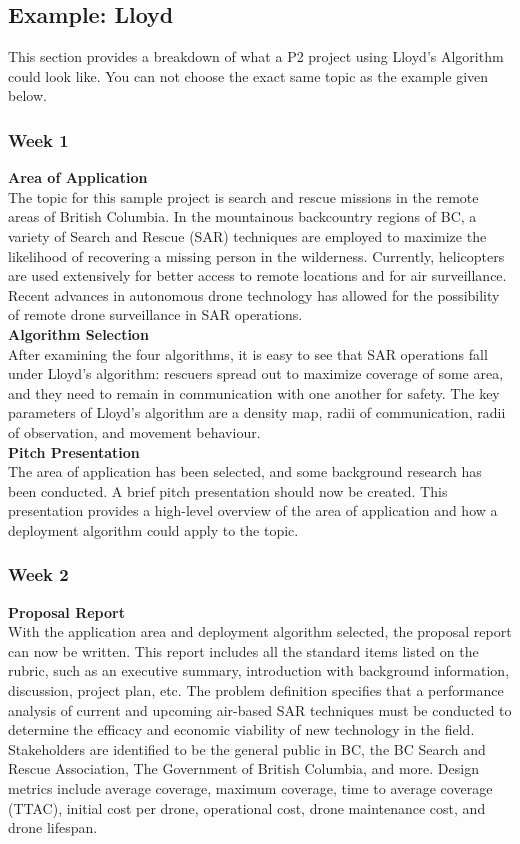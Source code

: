 \documentclass[../CourseManual.tex]{subfiles}
\begin{document}
\subsection{Example: Lloyd} \label{Example: Lloyd}
This section provides a breakdown of what a P2 project using Lloyd's Algorithm could look like. You can not choose the exact same topic as the example given below.

\subsubsection{Week 1}
\textbf{Area of Application}\\
The topic for this sample project is search and rescue missions in the remote areas of British Columbia. In the mountainous backcountry regions of BC, a variety of Search and Rescue (SAR) techniques are employed to maximize the likelihood of recovering a missing person in the wilderness. Currently, helicopters are used extensively for better access to remote locations and for air surveillance. Recent advances in autonomous drone technology has allowed for the possibility of remote drone surveillance in SAR operations. \\

\textbf{Algorithm Selection}\\
After examining the four algorithms, it is easy to see that SAR operations fall under Lloyd's algorithm: rescuers spread out to maximize coverage of some area, and they need to remain in communication with one another for safety. The key parameters of Lloyd's algorithm are a density map, radii of communication, radii of observation, and movement behaviour. \\

\textbf{Pitch Presentation}\\
The area of application has been selected, and some background research has been conducted. A brief pitch presentation should now be created. This presentation provides a high-level overview of the area of application and how a deployment algorithm could apply to the topic.

\subsubsection{Week 2}
\textbf{Proposal Report}\\
With the application area and deployment algorithm selected, the proposal report can now be written. This report includes all the standard items listed on the rubric, such as an executive summary, introduction with background information, discussion, project plan, etc. The problem definition specifies that a performance analysis of current and upcoming air-based SAR techniques must be conducted to determine the efficacy and economic viability of new technology in the field. Stakeholders are identified to be the general public in BC, the BC Search and Rescue Association, The Government of British Columbia, and more. Design metrics include average coverage, maximum coverage, time to average coverage (TTAC), initial cost per drone, operational cost, drone maintenance cost, and drone lifespan. \\
\end{document}
